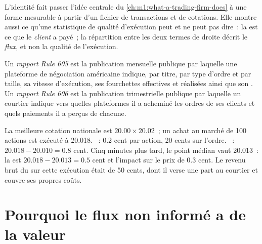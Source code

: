L'identité fait passer l'idée centrale du \cref{ch:m1:what-a-trading-firm-does}
à une forme mesurable à partir d'un fichier de transactions et de cotations. Elle montre
aussi ce qu'une statistique de qualité d'exécution peut et ne peut pas dire~: la  est ce que le \emph{client} a payé~; la répartition entre les deux termes de droite
décrit le \emph{flux}, et non la qualité de l'exécution.

\begin{definition}\label{def:m1:retail-flow-and-wholesaling:reports}
Un \emph{rapport Rule 605} est la publication mensuelle
publique par laquelle une plateforme de négociation américaine indique, par titre, par type d'ordre et par taille,
sa vitesse d'exécution, ses fourchettes effectives et réalisées ainsi que son . Un \emph{rapport Rule 606} est la publication trimestrielle
publique par laquelle un courtier indique vers quelles plateformes il a acheminé
les ordres de ses clients et quels paiements il a perçus de chacune.
\end{definition}

\begin{example}\label{ex:m1:retail-flow-and-wholesaling:onefill}
La meilleure cotation nationale est $20.00 \times 20.02$~; un achat au marché
de 100 actions est exécuté à 20.018. ~: 0.2 cent par action, 20
cents sur l'ordre. ~: $20.018 - 20.010 = 0.8$ cent.
Cinq minutes plus tard, le point médian vaut 20.013~: la  est $20.018 -
20.013 = 0.5$ cent et l'impact sur le prix de 0.3 cent. Le revenu brut
du  sur cette exécution était de 50 cents, dont il verse une part au courtier
et couvre ses propres coûts.
\end{example}

\section{Pourquoi le flux non informé a de la valeur}

